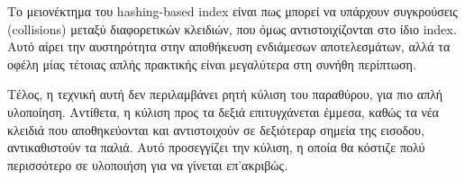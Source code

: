 Το μειονέκτημα του hashing-based index είναι πως μπορεί να υπάρχουν συγκρούσεις (collisions) μεταξύ διαφορετικών κλειδιών, που όμως αντιστοιχίζονται στο ίδιο index.
Αυτό αίρει την αυστηρότητα στην αποθήκευση ενδιάμεσων αποτελεσμάτων, αλλά τα οφέλη μίας τέτοιας απλής πρακτικής είναι μεγαλύτερα στη συνήθη περίπτωση.

Τέλος, η τεχνική αυτή δεν περιλαμβάνει ρητή κύλιση του παραθύρου, για πιο απλή υλοποίηση.
Αντίθετα, η κύλιση προς τα δεξιά επιτυγχάνεται έμμεσα, καθώς τα νέα κλειδιά που αποθηκεύονται και αντιστοιχούν σε δεξιότεραρ σημεία της εισοδου, αντικαθιστούν τα παλιά.
Αυτό προσεγγίζει την κύλιση, η οποία θα κόστιζε πολύ περισσότερο σε υλοποιήση για να γίνεται επ'ακριβώς.

